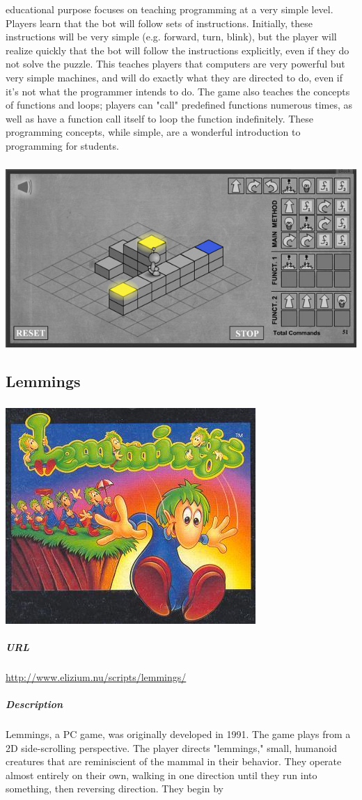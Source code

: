 educational purpose focuses on teaching programming at a very simple level. Players learn that the bot will follow sets of instructions. Initially, these instructions will be very simple (e.g. forward, turn, blink), but the player will realize quickly that the bot will follow the instructions explicitly, even if they do not solve the puzzle. This teaches players that computers are very powerful but very simple machines, and will do exactly what they are directed to do, even if it's not what the programmer intends to do. The game also teaches the concepts of functions and loops; players can "call" predefined functions numerous times, as well as have a function call itself to loop the function indefinitely. These programming concepts, while simple, are a wonderful introduction to programming for students. \subparagraph{}\includegraphics[width = \textwidth]{img/lightbot_screen.jpg}\subsection{Lemmings}\subparagraph{}\includegraphics[width = \textwidth]{img/lemmings_title.jpg}\subparagraph{URL}\url{http://www.elizium.nu/scripts/lemmings/}\subparagraph{Description}Lemmings, a PC game, was originally developed in 1991. The game plays from a 2D side-scrolling perspective. The player directs "lemmings," small, humanoid creatures that are reminiscient of the mammal in their behavior. They operate almost entirely on their own, walking in one direction until they run into something, then reversing direction. They begin by 